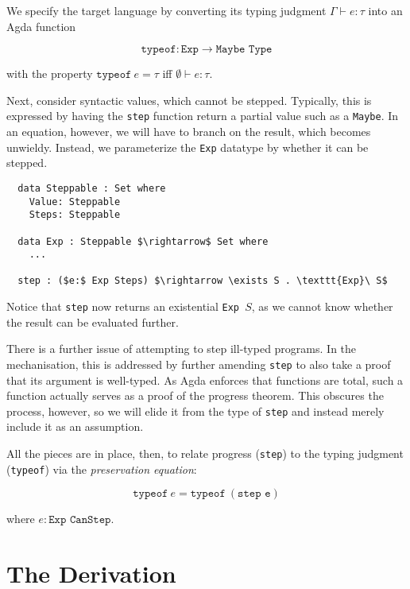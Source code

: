 \documentclass[manuscript,screen,review,sigplan]{acmart}
\begin{document}
We specify the target language by converting its typing judgment $\Gamma
\vdash e : \tau$ into an Agda function

\begin{equation*}
  \texttt{typeof} : \texttt{Exp} \rightarrow \texttt{Maybe Type}
\end{equation*}

with the property $\texttt{typeof}\ e = \tau$ iff $\emptyset \vdash e : \tau$.

Next, consider syntactic values, which cannot be stepped. Typically, this is
expressed by having the \texttt{step} function return a partial value such as a
\texttt{Maybe}. In an equation, however, we will have to branch on the result,
which becomes unwieldy. Instead, we parameterize the \texttt{Exp} datatype by
whether it can be stepped.

\begin{lstlisting}
  data Steppable : Set where
    Value: Steppable
    Steps: Steppable

  data Exp : Steppable $\rightarrow$ Set where
    ...

  step : ($e:$ Exp Steps) $\rightarrow \exists S . \texttt{Exp}\ S$
\end{lstlisting}

Notice that \texttt{step} now returns an existential \texttt{Exp }$S$, as we
cannot know whether the result can be evaluated further.

There is a further issue of attempting to step ill-typed programs. In the
mechanisation, this is addressed by further amending \texttt{step} to also take
a proof that its argument is well-typed. As Agda enforces that functions are
total, such a function actually serves as a proof of the progress theorem.
This obscures the process, however, so we will elide it from the type of
\texttt{step} and instead merely include it as an assumption.

All the pieces are
in place, then, to relate progress (\texttt{step}) to the typing judgment
(\texttt{typeof}) via the \emph{preservation equation}:

\begin{equation}\label{eq:preservation}
  \texttt{typeof}\ e = \texttt{typeof}\ (\texttt{step e})
\end{equation}

where $e : \texttt{Exp CanStep}$.

\section{The Derivation}
\end{document}
